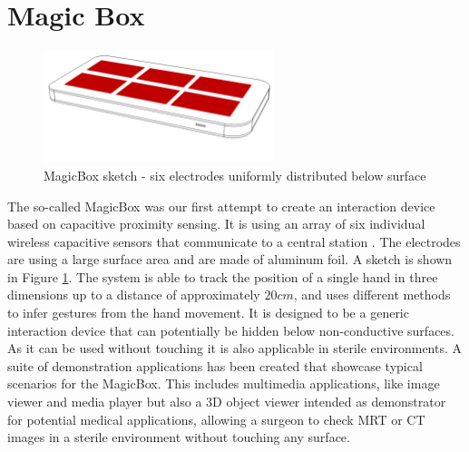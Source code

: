 \section{Magic Box}
\begin{figure}[h]
\centering
\includegraphics[width=0.6\textwidth]{images/magicbox}
\caption{MagicBox sketch - six electrodes uniformly distributed below surface}
\label{fig:magicbox_sketch}
\end{figure}
The so-called MagicBox was our first attempt to create an interaction device based on capacitive proximity sensing. It is using an array of six individual wireless capacitive sensors that communicate to a central station \cite{Braun2011MultiInputDevice}. The electrodes are using a large surface area and are made of aluminum foil. A sketch is shown in Figure \ref{fig:magicbox_sketch}. The system is able to track the position of a single hand in three dimensions up to a distance of approximately $20cm$, and uses different methods to infer gestures from the hand movement. 
It is designed to be a generic interaction device that can potentially be hidden below non-conductive surfaces. As it can be used without touching it is also applicable in sterile environments. A suite of demonstration applications has been created that showcase typical scenarios for the MagicBox. This includes multimedia applications, like image viewer and media player but also a 3D object viewer intended as demonstrator for potential medical applications, allowing a surgeon to check MRT or CT images in a sterile environment without touching any surface.
